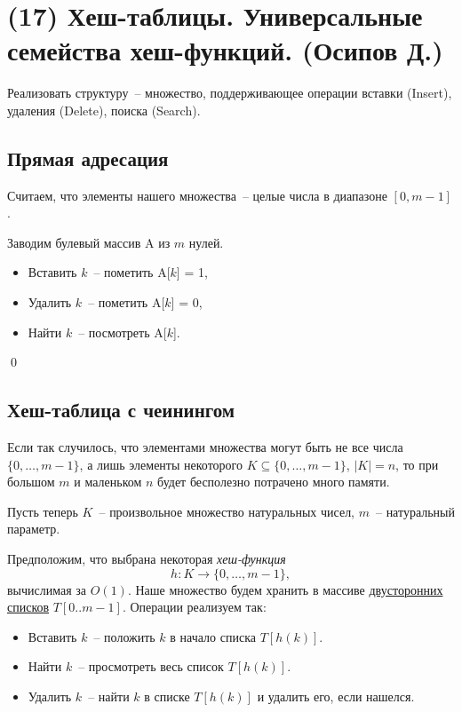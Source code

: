 \section{(17) Хеш-таблицы. Универсальные семейства хеш-функций. (Осипов Д.)}

\begin{problem*}
	Реализовать структуру~-- множество, поддерживающее операции вставки (Insert), удаления (Delete), поиска (Search).
\end{problem*}
\subsection{Прямая адресация}
Считаем, что элементы нашего множества~-- целые числа в диапазоне $[0, m-1]$.

 Заводим булевый массив A из $m$ нулей.
\begin{itemize}
    \item Вставить $k$~-- пометить A[$k$] = 1,
    \item Удалить $k$~-- пометить A[$k$] = 0,
    \item Найти $k$~-- посмотреть A[$k$].
\end{itemize}\qed

\subsection{Хеш-таблица с чеинингом}
Если так случилось, что элементами множества могут быть не все числа $\{0, \ldots, m-1\}$, а лишь элементы некоторого $K \subseteq \{0, \ldots, m-1\}$, $|K| = n$, то при большом $m$ и маленьком $n$ будет бесполезно потрачено много памяти.

Пусть теперь $K$~-- произвольное множество натуральных чисел, $m$~-- натуральный параметр.


Предположим, что выбрана некоторая \textit{хеш-функция} $$h: K \rightarrow \{0, \ldots, m-1\},$$ вычислимая за $O(1)$. Наше множество будем хранить в массиве \underline{двусторонних списков} $T[0..m-1]$. Операции реализуем так:
\begin{itemize}
    \item Вставить $k$~-- положить $k$ в начало списка $T[h(k)]$.
    \item Найти $k$~-- просмотреть весь список $T[h(k)]$.
    \item Удалить $k$~-- найти $k$ в списке $T[h(k)]$ и удалить его, если нашелся.
\end{itemize}

